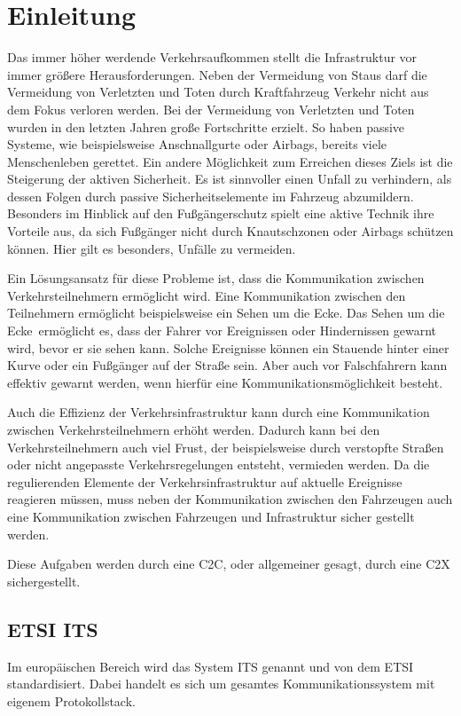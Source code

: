 \chapter{Einleitung \label{chap_einleitung}}
Das immer höher werdende Verkehrsaufkommen stellt die Infrastruktur vor immer größere Herausforderungen. Neben der Vermeidung von Staus darf die Vermeidung von Verletzten und Toten durch Kraftfahrzeug Verkehr nicht aus dem Fokus verloren werden. Bei der Vermeidung von Verletzten und Toten wurden in den letzten Jahren große Fortschritte erzielt. So haben passive Systeme, wie beispielsweise Anschnallgurte oder Airbags, bereits viele Menschenleben gerettet. Ein andere Möglichkeit zum Erreichen dieses Ziels ist die Steigerung der aktiven Sicherheit. Es ist sinnvoller einen Unfall zu verhindern, als dessen Folgen durch passive Sicherheitselemente im Fahrzeug abzumildern. Besonders im Hinblick auf den Fußgängerschutz spielt eine aktive Technik ihre Vorteile aus, da sich Fußgänger nicht durch Knautschzonen oder Airbags schützen können. Hier gilt es besonders, Unfälle zu vermeiden.

Ein Lösungsansatz für diese Probleme ist, dass die Kommunikation zwischen Verkehrsteilnehmern ermöglicht wird. Eine Kommunikation zwischen den Teilnehmern ermöglicht beispielsweise ein \glqq Sehen um die Ecke\grqq. Das \glqq Sehen um die Ecke\grqq~ermöglicht es, dass der Fahrer vor Ereignissen oder Hindernissen gewarnt wird, bevor er sie sehen kann. Solche Ereignisse können ein Stauende hinter einer Kurve oder ein Fußgänger auf der Straße sein. Aber auch vor Falschfahrern kann effektiv gewarnt werden, wenn hierfür eine Kommunikationsmöglichkeit besteht.

Auch die Effizienz der Verkehrsinfrastruktur kann durch eine Kommunikation zwischen Verkehrsteilnehmern erhöht werden. Dadurch kann bei den Verkehrsteilnehmern auch viel Frust, der beispielsweise durch verstopfte Straßen oder nicht angepasste Verkehrsregelungen entsteht, vermieden werden. Da die regulierenden Elemente der Verkehrsinfrastruktur auf aktuelle Ereignisse reagieren müssen, muss neben der Kommunikation zwischen den Fahrzeugen auch eine Kommunikation zwischen Fahrzeugen und Infrastruktur sicher gestellt werden.

Diese Aufgaben werden durch eine \ac{C2C}, oder allgemeiner gesagt, durch eine \ac{C2X} sichergestellt. 

\section{ETSI ITS}
Im europäischen Bereich wird das System \ac{ITS} genannt und von dem \ac{ETSI} standardisiert. Dabei handelt es sich um gesamtes Kommunikationssystem mit eigenem Protokollstack. 

